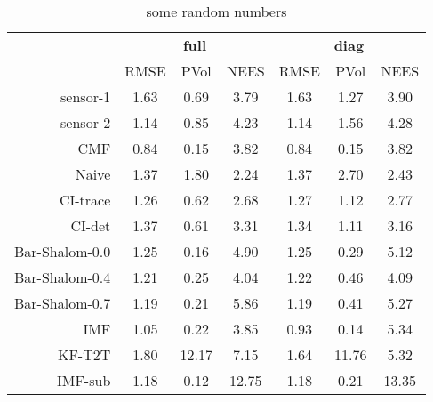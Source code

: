 \begin{table}[H]
	\centering
	\begin{tabular}{r|ccc|ccc}
	\toprule
       &  \multicolumn{3}{c|}{\textbf{full}}      & \multicolumn{3}{c}{\textbf{diag}}  \\
           &    RMSE &  PVol & NEES  & RMSE  & PVol & NEES        \\
    \midrule
    sensor-1    &    1.63   &  0.69 &  3.79   &    1.63 &   1.27 &     3.90     \\
    sensor-2    &    1.14   &  0.85 &  4.23   &    1.14 &   1.56 &     4.28     \\
    CMF         &    0.84   &  0.15 &  3.82   &    0.84 &   0.15 &     3.82     \\
  \midrule
    Naive       &    1.37   &  1.80 &  2.24   &    1.37 &   2.70 &     2.43     \\
    CI-trace    &    1.26   &  0.62 &  2.68   &    1.27 &   1.12 &     2.77     \\
    CI-det      &    1.37   &  0.61 &  3.31   &    1.34 &   1.11 &     3.16     \\
    Bar-Shalom-0.0      &    1.25   &  0.16 &  4.90   &    1.25 &   0.29 &     5.12     \\
    Bar-Shalom-0.4      &    1.21   &  0.25 &  4.04   &    1.22 &   0.46 &     4.09     \\
    Bar-Shalom-0.7      &    1.19   &  0.21 &  5.86   &    1.19 &   0.41 &     5.27     \\
    \midrule
    IMF         &    1.05   &  0.22 &  3.85   &    0.93 &   0.14 &     5.34     \\
    KF-T2T      &    1.80   & 12.17 & 7.15   &    1.64  &  11.76 &     5.32     \\
    IMF-sub     &    1.18   &  0.12 & 12.75   &    1.18 &   0.21 &    13.35     \\
	\bottomrule
	\end{tabular}
	\caption{some random numbers}
	\label{tab:res_prob1_vel_rmse}
\end{table}




